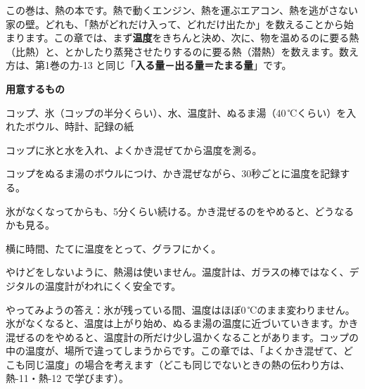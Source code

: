 \noindent この巻は、熱の本です。熱で動くエンジン、熱を運ぶエアコン、熱を逃がさない家の壁。どれも、「熱がどれだけ入って、どれだけ出たか」を数えることから始まります。この章では、まず\textbf{温度}をきちんと決め、次に、物を温めるのに要る熱（比熱）と、とかしたり蒸発させたりするのに要る熱（潜熱）を数えます。数え方は、第1巻の力-13 と同じ「\textbf{入る量－出る量＝たまる量}」です。

\begin{yattemiyou}
\textbf{用意するもの}\par
コップ、氷（コップの半分くらい）、水、温度計、ぬるま湯（40\,℃くらい）を入れたボウル、時計、記録の紙\par\vspace{2pt}
\noindent\begin{minipage}[c]{0.6\linewidth}
\begin{enumerate}[label={\bkcircled[bkGreen]{\arabic*}}, leftmargin=2.4\zw, itemsep=1pt, topsep=0pt]
\item コップに氷と水を入れ、よくかき混ぜてから温度を測る。
\item コップをぬるま湯のボウルにつけ、かき混ぜながら、30秒ごとに温度を記録する。
\item 氷がなくなってからも、5分くらい続ける。かき混ぜるのをやめると、どうなるかも見る。
\item 横に時間、たてに温度をとって、グラフにかく。
\end{enumerate}
\end{minipage}\hfill
\begin{minipage}[c]{0.36\linewidth}\centering
{}
\end{minipage}\par\vspace{2pt}
{\small やけどをしないように、熱湯は使いません。温度計は、ガラスの棒ではなく、デジタルの温度計がわれにくく安全です。}
\end{yattemiyou}

\noindent やってみようの答え：氷が残っている間、温度はほぼ0\,℃のまま変わりません。氷がなくなると、温度は上がり始め、ぬるま湯の温度に近づいていきます。かき混ぜるのをやめると、温度計の所だけ少し温かくなることがあります。コップの中の温度が、場所で違ってしまうからです。この章では、「よくかき混ぜて、どこも同じ温度」の場合を考えます（どこも同じでないときの熱の伝わり方は、熱-11・熱-12 で学びます）。

